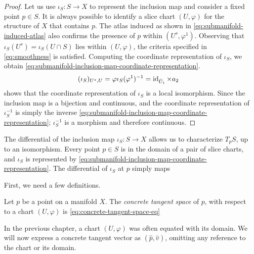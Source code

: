 \documentclass[../main-manifolds.tex]{subfiles}
\begin{document}
\begin{proof}
    Let us use $\iota_{S}: S\to X$ to represent the inclusion map and consider a fixed point $p\in S$. It is always possible to identify a slice chart $(U,\varphi)$ for the structure of $X$ that contains $p$. The atlas induced as shown in \cref{eq:submanifold-induced-atlas} also confirms the presence of $p$ within $(U^s,\varphi^1)$. Observing that $\iota_S(U^s) = \iota_S(U\cap S)$ lies within $(U,\varphi)$, the criteria specified in \cref{eq:smoothness} is satisfied. Computing the coordinate representation of $\iota_S$, we obtain \cref{eq:submanifold-inclusion-map-coordinate-representation}.
    \begin{equation}\label{eq:submanifold-inclusion-map-coordinate-representation}
        (\iota_S)_{U^s,U} = \varphi\iota_S(\varphi^1)^{-1} = \operatorname{id}_{\hat{U}_1}\times a_2
    \end{equation}
     shows that the coordinate representation of $\iota_S$ is a local isomorphism. Since the inclusion map is a bijection and continuous, and the coordinate representation of $\iota_S^{-1}$ is simply the inverse \cref{eq:submanifold-inclusion-map-coordinate-representation}; $\iota_S^{-1}$ is a morphism and therefore continuous.
\end{proof}
The differential of the inclusion map $\iota_S: S\to X$ allows us to characterize $T_pS$, up to an isomorphism. Every point $p\in S$ is in the domain of a pair of slice charts, and $\iota_S$ is represented by \cref{eq:submanifold-inclusion-map-coordinate-representation}. The differential of $\iota_S$ at $p$ simply maps 

First, we need a few definitions.

\begin{definition}
    Let $p$ be a point on a manifold $X$. The \emph{concrete tangent space} of $p$, with respect to a chart $(U,\varphi)$ is \cref{eq:concrete-tangent-space-eq}
\end{definition}


% 

In the previous chapter, a chart $(U,\varphi)$ was often equated with its domain. We will now express a concrete tangent vector as $(\hat{p}, \hat{v})$, omitting any reference to the chart or its domain. \\
\end{document}
